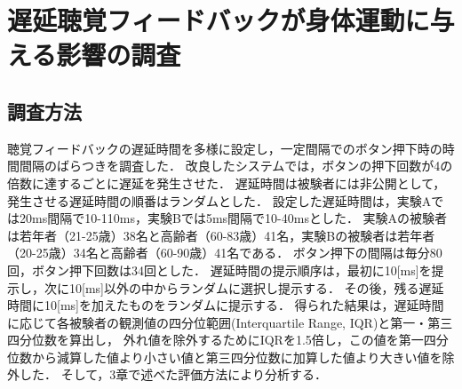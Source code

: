 \section{遅延聴覚フィードバックが身体運動に与える影響の調査}
\subsection{調査方法}
聴覚フィードバックの遅延時間を多様に設定し，一定間隔でのボタン押下時の時間間隔のばらつきを調査した．
改良したシステムでは，ボタンの押下回数が4の倍数に達するごとに遅延を発生させた．
遅延時間は被験者には非公開として，発生させる遅延時間の順番はランダムとした．
設定した遅延時間は，実験Aでは20ms間隔で10-110ms，実験Bでは5ms間隔で10-40msとした．
実験Aの被験者は若年者（21-25歳）38名と高齢者（60-83歳）41名，実験Bの被験者は若年者（20-25歳）34名と高齢者（60-90歳）41名である．
ボタン押下の間隔は毎分80回，ボタン押下回数は34回とした．
遅延時間の提示順序は，最初に10[ms]を提示し，次に10[ms]以外の中からランダムに選択し提示する．
その後，残る遅延時間に10[ms]を加えたものをランダムに提示する．
得られた結果は，遅延時間に応じて各被験者の観測値の四分位範囲(Interquartile Range, IQR)と第一・第三四分位数を算出し，
外れ値を除外するためにIQRを1.5倍し，この値を第一四分位数から減算した値より小さい値と第三四分位数に加算した値より大きい値を除外した．
そして，3章で述べた評価方法により分析する．

